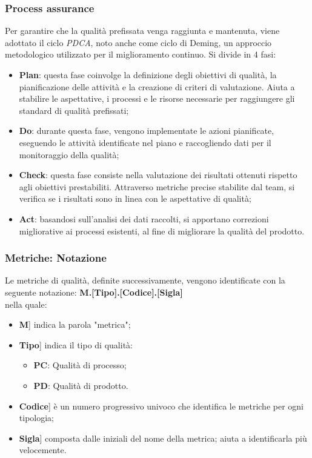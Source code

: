 \documentclass[10pt, a4paper]{article}
\begin{document}
\subsubsection{Process assurance}
Per garantire che la qualità prefissata venga raggiunta e mantenuta, viene adottato il ciclo \textit{PDCA\pg}, noto anche come ciclo di Deming, un approccio metodologico utilizzato per il miglioramento continuo. Si divide in 4 fasi:
\begin{itemize}
    \item \textbf{Plan}: questa fase coinvolge la definizione degli obiettivi di qualità, la pianificazione delle attività e la creazione di criteri di valutazione. Aiuta a stabilire le aspettative, i processi e le risorse necessarie per raggiungere gli standard di qualità prefissati;
    \item \textbf{Do}: durante questa fase, vengono implementate le azioni pianificate, eseguendo le attività identificate nel piano e raccogliendo dati per il monitoraggio della qualità;
    \item \textbf{Check}: questa fase consiste nella valutazione dei risultati ottenuti rispetto agli obiettivi prestabiliti. Attraverso metriche precise stabilite dal team, si verifica se i risultati sono in linea con le aspettative di qualità;
    \item \textbf{Act}: basandosi sull'analisi dei dati raccolti, si apportano correzioni migliorative ai processi esistenti, al fine di migliorare la qualità del prodotto.
\end{itemize}

\subsubsection{Metriche: Notazione}
Le metriche di qualità, definite successivamente, vengono identificate con la seguente notazione:
\textbf{M.[Tipo].[Codice].[Sigla]}\\
nella quale:
\begin{itemize}
\item \lbrack \textbf{M}] indica la parola "metrica";
\item \lbrack \textbf{Tipo}] indica il tipo di qualità:
\begin{itemize}
    \item \textbf{PC}: Qualità di processo;
    \item \textbf{PD}: Qualità di prodotto.
\end{itemize}
\item \lbrack \textbf{Codice}] è un numero progressivo univoco che identifica le metriche per ogni tipologia;
\item \lbrack \textbf{Sigla}] composta dalle iniziali del nome della metrica; aiuta a identificarla più velocemente.
\end{itemize}
\end{document}
